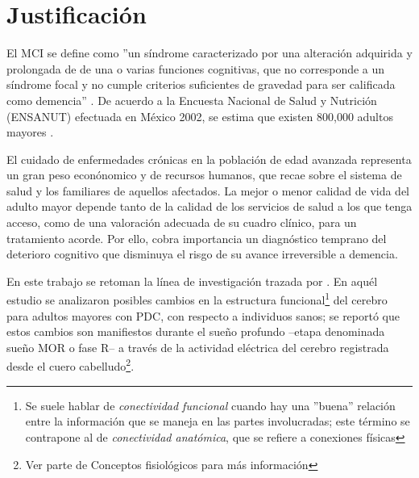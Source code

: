 
\section{Justificaci\'on}

El MCI se define como ''un s\'indrome caracterizado por una alteraci\'on adquirida y prolongada de
de una o varias funciones cognitivas, que no corresponde a un s\'indrome focal y no cumple
criterios suficientes de gravedad para ser calificada como demencia'' \cite{Robles02}.
De acuerdo a la Encuesta Nacional de Salud y Nutrici\'on (ENSANUT) efectuada en M\'exico 2002,
se estima que existen 800,000 adultos mayores \cite{Sosa12}.


El cuidado de enfermedades cr\'onicas 
en la poblaci\'on de edad avanzada representa un gran peso
econ\'onomico y de recursos humanos, que
recae sobre el sistema de salud y los familiares de aquellos afectados. 
La mejor o menor calidad 
de vida del adulto mayor depende tanto de la calidad de los servicios de salud a los que tenga
acceso, como de una valoraci\'on adecuada de su cuadro cl\'inico, para un tratamiento acorde.
Por ello, cobra importancia un diagn\'ostico temprano del deterioro cognitivo que disminuya
el risgo de su avance irreversible a demencia.


En este trabajo se retoman %
la l\'inea de investigaci\'on trazada por \cite{VazquezTagle16}.
En aqu\'el estudio se analizaron
posibles cambios en la estructura funcional\footnote{Se suele hablar de 
\textit{conectividad funcional} cuando hay una ''buena'' relaci\'on entre la informaci\'on
que se maneja en las partes involucradas; este t\'ermino se contrapone al de
\textit{conectividad anat\'omica}, que se refiere a conexiones f\'isicas}
del cerebro para adultos mayores con PDC, con 
respecto a individuos sanos; se report\'o que estos cambios son manifiestos durante el sue\~no
profundo --etapa denominada sue\~no MOR o fase R-- 
a trav\'es de la actividad el\'ectrica del cerebro registrada desde el cuero 
cabelludo\footnote{Ver parte de Conceptos fisiol\'ogicos para m\'as informaci\'on}. 

